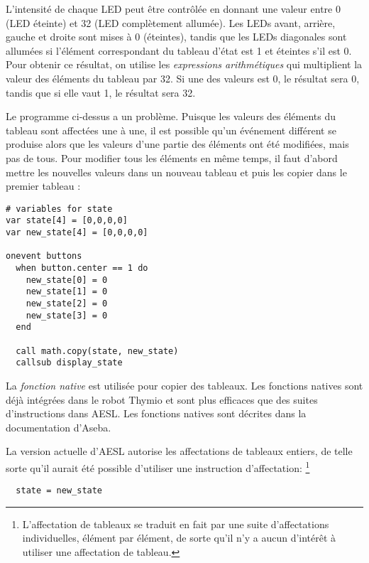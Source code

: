 L'intensité de chaque LED peut être contrôlée en donnant une valeur entre 0 (LED éteinte)
et 32 (LED complètement allumée).
Les LEDs avant, arrière, gauche et droite sont mises à 0 (éteintes), tandis que les LEDs diagonales
sont allumées si l'élément correspondant du tableau d'état est 1
et éteintes s'il est 0.
Pour obtenir ce résultat, on utilise les \emph{expressions arithmétiques} 
qui multiplient la valeur des éléments du tableau par 32.
Si une des valeurs est 0, le résultat sera 0, tandis que si elle vaut 1, le résultat sera 32.

\newpage


Le programme ci-dessus a un problème.
Puisque les valeurs des éléments du tableau  sont affectées une à une,
il est possible qu'un événement différent se produise
alors que les valeurs d'une partie des éléments ont été modifiées, mais pas de tous.
Pour modifier tous les éléments en même temps, il faut d'abord mettre les nouvelles valeurs
dans un nouveau tableau  et puis les copier dans le premier tableau :

\begin{footnotesize}
\begin{verbatim}
# variables for state
var state[4] = [0,0,0,0]
var new_state[4] = [0,0,0,0]

onevent buttons
  when button.center == 1 do
    new_state[0] = 0
    new_state[1] = 0
    new_state[2] = 0
    new_state[3] = 0
  end
  
  call math.copy(state, new_state)
  callsub display_state
\end{verbatim}
\end{footnotesize}

La \emph{fonction native}  est utilisée pour copier des tableaux.
Les fonctions natives sont déjà intégrées dans le robot Thymio et sont plus efficaces
que des suites d'instructions dans AESL.
Les fonctions natives sont décrites dans la documentation d'Aseba.

La version actuelle d'AESL autorise les affectations de tableaux entiers, de telle sorte qu'il
aurait été possible d'utiliser une instruction d'affectation:
\footnote{L'affectation de tableaux se traduit en fait par une suite d'affectations individuelles,
élément par élément, de sorte qu'il n'y a aucun d'intérêt à utiliser une affectation de tableau.}

\begin{footnotesize}
\begin{verbatim}
  state = new_state
\end{verbatim}
\end{footnotesize}
